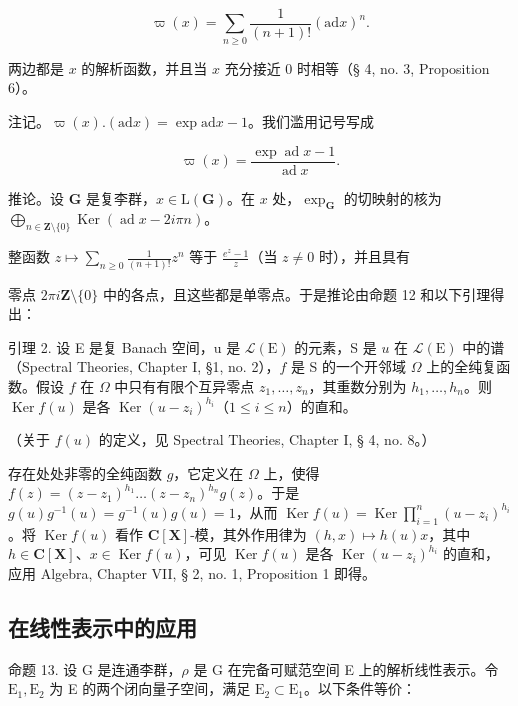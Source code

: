 \[
\varpi (x) = \sum_ {n \geqslant 0} \frac {1}{(n + 1) !} (\mathrm{ad} x) ^ {n}.
\]

两边都是 \(x\) 的解析函数，并且当 \(x\) 充分接近 0 时相等（§ 4, no. 3, Proposition 6）。

注记。\(\varpi(x) . (\mathrm{ad} x) = \exp \mathrm{ad} x - 1\)。我们滥用记号写成

\[
\varpi (x) = \frac {\exp \operatorname{ad} x - 1}{\operatorname{ad} x}.
\]

推论。设 \(\mathbf{G}\) 是复李群，\(x \in \mathrm{L}(\mathbf{G})\)。在 \(x\) 处，\(\exp_{\mathbf{G}}\) 的切映射的核为 \(\bigoplus_{n \in \mathbf{Z}\setminus\{0\}} \operatorname{Ker}(\operatorname{ad} x - 2i\pi n)\)。

整函数 \(z \mapsto \sum_{n \geqslant 0} \frac{1}{(n + 1)!} z^n\) 等于 \(\frac{e^z - 1}{z}\)（当 \(z \neq 0\) 时），并且具有

零点 \(2\pi i\mathbf{Z}\setminus\{0\}\) 中的各点，且这些都是单零点。于是推论由命题 12 和以下引理得出：

引理 2. 设 E 是复 Banach 空间，u 是 \(\mathcal{L}(\mathrm{E})\) 的元素，S 是 \(u\) 在 \(\mathcal{L}(\mathrm{E})\) 中的谱（Spectral Theories, Chapter I, §1, no. 2），\(f\) 是 S 的一个开邻域 \(\Omega\) 上的全纯复函数。假设 \(f\) 在 \(\Omega\) 中只有有限个互异零点 \(z_{1},\ldots ,z_{n}\)，其重数分别为 \(h_1,\dots,h_n\)。则 \(\operatorname {Ker}f(u)\) 是各 \(\operatorname {Ker}(u - z_i)^{h_i}\)（\(1\leqslant i\leqslant n\)）的直和。

（关于 \(f(u)\) 的定义，见 Spectral Theories, Chapter I, § 4, no. 8。）

存在处处非零的全纯函数 \(g\)，它定义在 \(\Omega\) 上，使得 \(f(z) = (z - z_1)^{h_1} \ldots (z - z_n)^{h_n} g(z)\)。于是 \(g(u)g^{-1}(u) = g^{-1}(u)g(u) = 1\)，从而 \(\operatorname{Ker}f(u) = \operatorname{Ker}\prod_{i=1}^{n}(u - z_i)^{h_i}\)。将 \(\operatorname{Ker}f(u)\) 看作 \(\mathbf{C}[\mathbf{X}]\)-模，其外作用律为 \((h,x)\mapsto h(u)x\)，其中 \(h\in \mathbf{C}[\mathbf{X}]\)、\(x\in \operatorname{Ker}f(u)\)，可见 \(\operatorname{Ker} f(u)\) 是各 \(\operatorname{Ker}(u - z_i)^{h_i}\) 的直和，应用 Algebra, Chapter VII, § 2, no. 1, Proposition 1 即得。

\subsection{在线性表示中的应用}

命题 13. 设 G 是连通李群，\(\rho\) 是 G 在完备可赋范空间 E 上的解析线性表示。令 \(\mathrm{E}_1, \mathrm{E}_2\) 为 E 的两个闭向量子空间，满足 \(\mathrm{E}_2 \subset \mathrm{E}_1\)。以下条件等价：

